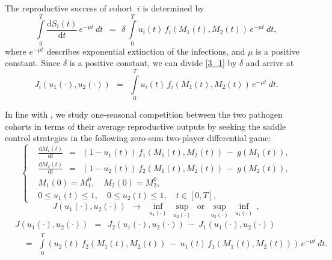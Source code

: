 \documentclass[a4paper,12pt]{article}
\begin{document}
The reproductive success of cohort~$ i $ is determined by
\begin{equation}
\int\limits_0^T \frac{\mathrm{d} S_i(t)}{\mathrm{d} t} \, e^{-\mu t} \: dt \:\: = \:\: \delta \,
\int\limits_0^T u_i(t) \, f_i(M_1(t), M_2(t)) \, e^{-\mu t} \: dt,  \label{3_1}
\end{equation}
where $ e^{-\mu t} $ describes exponential extinction of the infections, and $ \mu $ is a positive constant. Since $ \delta $ is
a positive constant, we can divide \cref{3_1} by $ \delta $ and arrive at
\begin{equation}
J_i(u_1(\cdot), u_2(\cdot)) \:\: = \:\: \int\limits_0^T u_i(t) \, f_i(M_1(t), M_2(t)) \, e^{-\mu t} \: dt.  \label{3}
\end{equation}

In line with \cite{YegorovGrognardMailleretHalkettBernhard2019,BernhardGrognardMailleretAkhmetzhanov2010},
we study one-seasonal competition between the two pathogen cohorts in terms of their average reproductive outputs by
seeking the saddle control strategies in the following zero-sum two-player differential game:
\begin{equation}
\left\{ \begin{aligned}
& \frac{\mathrm{d} M_1(t)}{\mathrm{d} t} \:\: = \:\: (1 - u_1(t)) \, f_1(M_1(t), M_2(t)) \: - \: g(M_1(t)), \\
& \frac{\mathrm{d} M_2(t)}{\mathrm{d} t} \:\: = \:\: (1 - u_2(t)) \, f_2(M_1(t), M_2(t)) \: - \: g(M_2(t)), \\
& M_1(0) = M_1^0, \quad M_2(0) = M_2^0, \\
& 0 \leqslant u_1(t) \leqslant 1, \quad 0 \leqslant u_2(t) \leqslant 1, \quad t \in [0, T],
\end{aligned} \right.  \label{7}
\end{equation}
\begin{equation}
J(u_1(\cdot), u_2(\cdot)) \:\: \longrightarrow \:\: \inf_{u_1(\cdot)} \: \sup_{u_2(\cdot)} \:\: \mbox{or} \:\:
\sup_{u_2(\cdot)} \: \inf_{u_1(\cdot)} \, ,  \label{8}
\end{equation}
\begin{equation}
\begin{aligned}
& J(u_1(\cdot), u_2(\cdot)) \:\: = \:\: J_2(u_1(\cdot), u_2(\cdot)) \: - \:
J_1(u_1(\cdot), u_2(\cdot)) \\
& \quad
= \:\: \int\limits_0^T \left( u_2(t) \, f_2(M_1(t), M_2(t)) \: - \: u_1(t) \, f_1(M_1(t), M_2(t)) \right) \,
e^{-\mu t} \: dt.
\end{aligned}  \label{9}
\end{equation}
\end{document}

